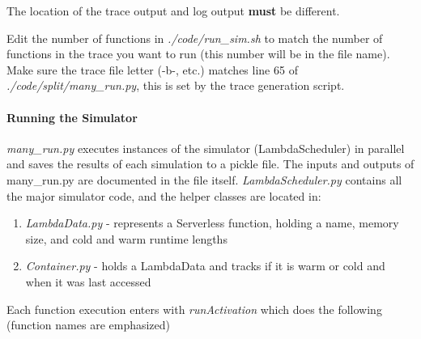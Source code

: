 The location of the trace output and log output {\bf must} be different.

Edit the number of functions in {\em ./code/run\_sim.sh} to match the number of functions in the trace you want to run (this number will be in the file name).
Make sure the trace file letter (-b-, etc.) matches line 65 of {\em ./code/split/many\_run.py}, this is set by the trace generation script.



\paragraph{Running the Simulator}

{\em many\_run.py} executes instances of the simulator (LambdaScheduler) in parallel and saves the results of each simulation to a pickle file.
The inputs and outputs of many\_run.py are documented in the file itself.
{\em LambdaScheduler.py} contains all the major simulator code, and the helper classes are located in:

\begin{enumerate} [label=Step \arabic{enumi}.,ref=Step \arabic{enumi}, leftmargin=*]
  \item {\em LambdaData.py} - represents a Serverless function, holding a name, memory size, and cold and warm runtime lengths
  \item {\em Container.py} - holds a LambdaData and tracks if it is warm or cold and when it was last accessed  
\end{enumerate}

Each function execution enters with {\em runActivation} which does the following (function names are emphasized)


